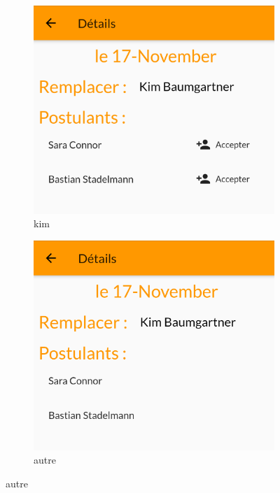     \begin{figure}[!h]
        \centering
        \begin{subfigure}{.3\textwidth}
            \centering
            \includegraphics[width=0.9\linewidth]{screenshots/scenario_03/detail_auth.png}
            \caption{kim}
            \label{fig:detail_auth}
        \end{subfigure}
        \begin{subfigure}{.3\textwidth}
            \centering
            \includegraphics[width=0.9\linewidth]{screenshots/scenario_03/detail_non_auth.png}
            \caption{autre}
            \label{fig:detail_non_auth}

\end{subfigure}
\end{figure}
